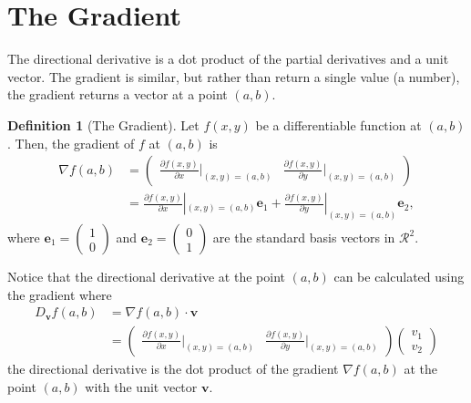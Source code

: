 \documentclass[
]{book}
\theoremstyle{definition}
\newtheorem{definition}{Definition}[chapter]
\theoremstyle{definition}
\theoremstyle{definition}
\theoremstyle{definition}
\theoremstyle{remark}
\begin{document}
\hypertarget{the-gradient}{%
\section{The Gradient}\label{the-gradient}}

The directional derivative is a dot product of the partial derivatives and a unit vector. The gradient is similar, but rather than return a single value (a number), the gradient returns a vector at a point \((a, b)\).

\begin{definition}[The Gradient]
Let \(f(x, y)\) be a differentiable function at \((a, b)\). Then, the gradient of \(f\) at \((a, b)\) is
\[
\begin{aligned}
\nabla f(a, b) & = \begin{pmatrix} \frac{\partial f(x, y)}{\partial x}|_{(x,y) = (a, b)} & \frac{\partial f(x, y)}{\partial y}|_{(x,y) = (a, b)} \end{pmatrix} \\
 & = \frac{\partial f(x, y)}{\partial x}|_{(x,y) = (a, b)} \mathbf{e}_1 + \frac{\partial f(x, y)}{\partial y}|_{(x,y) = (a, b)} \mathbf{e}_2,
\end{aligned}
\]
where \(\mathbf{e}_1 = \begin{pmatrix} 1 \\ 0 \end{pmatrix}\) and \(\mathbf{e}_2 = \begin{pmatrix} 0 \\ 1 \end{pmatrix}\) are the standard basis vectors in \(\mathcal{R}^2\).
\end{definition}

Notice that the directional derivative at the point \((a , b)\) can be calculated using the gradient where
\[
\begin{aligned}
D_{\mathbf{v}} f(a, b) & = \nabla f(a, b) \cdot \mathbf{v} \\
& = \begin{pmatrix} \frac{\partial f(x, y)}{\partial x}|_{(x,y) = (a, b)} & \frac{\partial f(x, y)}{\partial y}|_{(x,y) = (a, b)} \end{pmatrix} \begin{pmatrix} v_1 \\ v_2 \end{pmatrix}
\end{aligned}
\]
the directional derivative is the dot product of the gradient \(\nabla f(a, b)\) at the point \((a, b)\) with the unit vector \(\mathbf{v}\).
\end{document}
